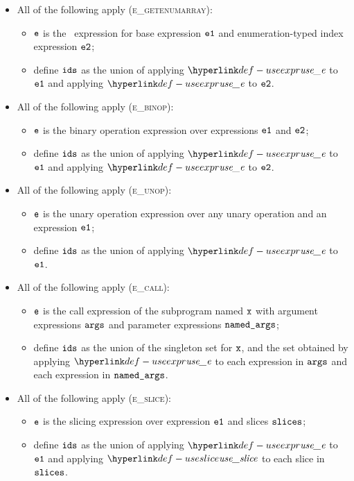 \begin{itemize}
  \item All of the following apply (\textsc{e\_getenumarray}):
  \begin{itemize}
    \item $\texttt{e}$ is the \arrayaccess\ expression for base expression $\texttt{e1}$ and enumeration-typed index expression $\texttt{e2}$;
    \item define $\texttt{ids}$ as the union of applying $\useexpr$ to $\texttt{e1}$ and applying $\useexpr$ to $\texttt{e2}$.
  \end{itemize}

  \item All of the following apply (\textsc{e\_binop}):
  \begin{itemize}
    \item $\texttt{e}$ is the binary operation expression over expressions $\texttt{e1}$ and $\texttt{e2}$;
    \item define $\texttt{ids}$ as the union of applying $\useexpr$ to $\texttt{e1}$ and applying $\useexpr$ to $\texttt{e2}$.
  \end{itemize}

  \item All of the following apply (\textsc{e\_unop}):
  \begin{itemize}
    \item $\texttt{e}$ is the unary operation expression over any unary operation and an expression $\texttt{e1}$;
    \item define $\texttt{ids}$ as the union of applying $\useexpr$ to $\texttt{e1}$.
  \end{itemize}

  \item All of the following apply (\textsc{e\_call}):
  \begin{itemize}
    \item $\texttt{e}$ is the call expression of the subprogram named $\texttt{x}$ with argument expressions $\texttt{args}$ and parameter expressions $\texttt{named\_args}$;
    \item define $\texttt{ids}$ as the union of the singleton set for $\texttt{x}$, and the set obtained by applying $\useexpr$ to each expression in
          $\texttt{args}$ and each expression in $\texttt{named\_args}$.
  \end{itemize}

  \item All of the following apply (\textsc{e\_slice}):
  \begin{itemize}
    \item $\texttt{e}$ is the slicing expression over expression $\texttt{e1}$ and slices $\texttt{slices}$;
    \item define $\texttt{ids}$ as the union of applying $\useexpr$ to $\texttt{e1}$ and applying $\useslice$ to each slice in $\texttt{slices}$.
  \end{itemize}


\end{itemize}
